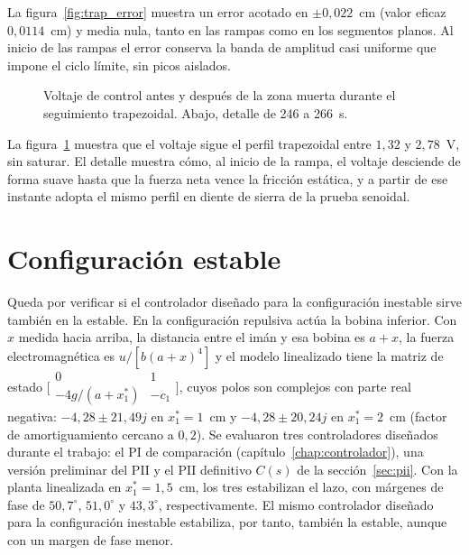 La figura~\ref{fig:trap_error} muestra un error acotado en $\pm 0{,}022$~cm (valor eficaz $0{,}0114$~cm) y media nula, tanto en las rampas como en los segmentos planos. Al inicio de las rampas el error conserva la banda de amplitud casi uniforme que impone el ciclo límite, sin picos aislados.

\FloatBarrier

\begin{figure}[ht]
    \centering
    
    \caption[Seguimiento trapezoidal: señal de control]{Voltaje de control antes y después de la zona muerta durante el seguimiento trapezoidal. Abajo, detalle de 246 a 266~s.}
    \label{fig:trap_ctrl}
\end{figure}

La figura~\ref{fig:trap_ctrl} muestra que el voltaje sigue el perfil trapezoidal entre $1{,}32$ y $2{,}78$~V, sin saturar. El detalle muestra cómo, al inicio de la rampa, el voltaje desciende de forma suave hasta que la fuerza neta vence la fricción estática, y a partir de ese instante adopta el mismo perfil en diente de sierra de la prueba senoidal.

\FloatBarrier

\section{Configuración estable}

Queda por verificar si el controlador diseñado para la configuración inestable sirve también en la estable. En la configuración repulsiva actúa la bobina inferior. Con $x$ medida hacia arriba, la distancia entre el imán y esa bobina es $a+x$, la fuerza electromagnética es $u/[b(a+x)^4]$ y el modelo linealizado tiene la matriz de estado $\bigl[\begin{smallmatrix}0&1\\-4g/(a+x_1^*)&-c_1\end{smallmatrix}\bigr]$, cuyos polos son complejos con parte real negativa: $-4{,}28\pm21{,}49j$ en $x_1^*=1$~cm y $-4{,}28\pm20{,}24j$ en $x_1^*=2$~cm (factor de amortiguamiento cercano a $0{,}2$). Se evaluaron tres controladores diseñados durante el trabajo: el PI de comparación (capítulo~\ref{chap:controlador}), una versión preliminar del PII y el PII definitivo $C(s)$ de la sección~\ref{sec:pii}. Con la planta linealizada en $x_1^*=1{,}5$~cm, los tres estabilizan el lazo, con márgenes de fase de $50{,}7^\circ$, $51{,}0^\circ$ y $43{,}3^\circ$, respectivamente. El mismo controlador diseñado para la configuración inestable estabiliza, por tanto, también la estable, aunque con un margen de fase menor.

